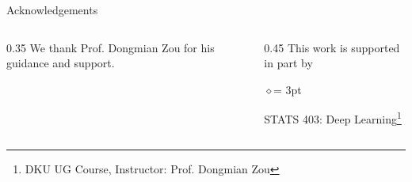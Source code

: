 
\begin{frame}{Acknowledgements}

  \begin{columns}
    \begin{column}{0.35\textwidth}
      We thank Prof. Dongmian Zou for his guidance and support.
    \end{column}
    \hspace*{2em}
    \begin{column}{0.45\textwidth}
      This work is supported in part by
      \begin{list}{$\diamond$}{\itemsep = 3pt \leftmargin=10pt}
        \item STATS 403: Deep Learning\footnote{DKU UG Course, Instructor: Prof. Dongmian Zou}
      \end{list}
    \end{column}
  \end{columns}

\end{frame}
